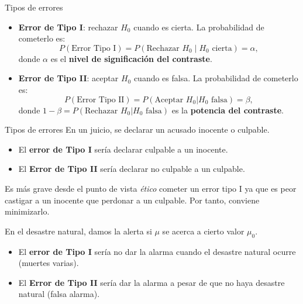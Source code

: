 \documentclass[
  ignorenonframetext,
]{beamer}
\begin{document}
\begin{frame}{Tipos de errores}
\protect\hypertarget{tipos-de-errores-1}{}
\begin{itemize}[<+->]
\item
  \textbf{Error de Tipo I}: rechazar \(H_0\) cuando es cierta. La
  probabilidad de cometerlo es:
  \[P(\mbox{Error Tipo I})=P(\mbox{Rechazar } H_{0}\mid H_{0} \mbox{ cierta})=\alpha,\]
  donde \(\alpha\) es el \textbf{nivel de significación del contraste}.
\item
  \textbf{Error de Tipo II}: aceptar \(H_0\) cuando es falsa. La
  probabilidad de cometerlo es:
  \[P(\mbox{Error Tipo II})=P(\mbox{Aceptar } H_{0}| H_{0} \mbox{ falsa})=\beta,\]
  donde \(1-\beta=P(\mbox{Rechazar } H_{0}|H_{0} \mbox{ falsa})\) es la
  \textbf{potencia del contraste}.
\end{itemize}
\end{frame}

\begin{frame}{Tipos de errores}
\protect\hypertarget{tipos-de-errores-2}{}
En un juicio, se declarar un acusado inocente o culpable.

\begin{itemize}[<+->]
\item
  El \textbf{error de Tipo I} sería declarar culpable a un inocente.
\item
  El \textbf{Error de Tipo II} sería declarar no culpable a un culpable.
\end{itemize}

Es más grave desde el punto de vista \emph{ético} cometer un error tipo
I ya que es peor castigar a un inocente que perdonar a un culpable. Por
tanto, conviene minimizarlo.

En el desastre natural, damos la alerta si \(\mu\) se acerca a cierto
valor \(\mu_0\).

\begin{itemize}[<+->]
\item
  El \textbf{error de Tipo I} sería no dar la alarma cuando el desastre
  natural ocurre (muertes varias).
\item
  El \textbf{Error de Tipo II} sería dar la alarma a pesar de que no
  haya desastre natural (falsa alarma).
\end{itemize}
\end{frame}
\end{document}
